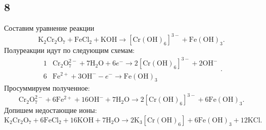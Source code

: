 \subsection{8}

Составим уравнение реакции
\[
\mathrm{K_2Cr_2O_7}+\mathrm{FeCl_2}+\mathrm{KOH}\longrightarrow\mathrm{[Cr(OH)_6]^{3-}}+\mathrm{Fe(OH)_3}.
\]
Полуреакции идут по следующим схемам:
\[
\begin{array}{r|l}
	1 & \mathrm{Cr_2O_7^{2-}}+7\mathrm{H_2O}+6e^-\longrightarrow2\mathrm{[Cr(OH)_6]^{3-}}+2\mathrm{OH^{-}} \\
	6 & \mathrm{Fe^{2+}}+3\mathrm{OH^-}-e^-\longrightarrow\mathrm{Fe(OH)_3}
\end{array}.
\]
Просуммируем полученное:
\[
\mathrm{Cr_2O_7^{2-}}+6\mathrm{Fe^{2+}}+16\mathrm{OH^-}+7\mathrm{H_2O}\longrightarrow2\mathrm{[Cr(OH)_6]^{3-}}+6\mathrm{Fe(OH)_3}.
\]
Допишем недостающие ионы:
\[
\mathrm{K_2Cr_2O_7}+6\mathrm{FeCl_2}+16\mathrm{KOH}+7\mathrm{H_2O}\longrightarrow2\mathrm{K_3[Cr(OH)_6]}+6\mathrm{Fe(OH)_3}+12\mathrm{KCl}.
\]